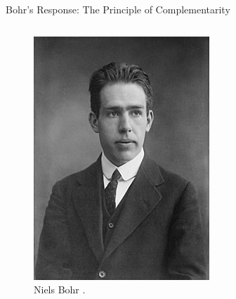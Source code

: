 \begin{frame}{Bohr's Response: The Principle of Complementarity}
\begin{columns}[T]
    \begin{column}{0.45\textwidth}
      \begin{figure}
        \centering
        \includegraphics[width=\linewidth, height=0.7\textheight, keepaspectratio]{images/NielsBohr.jpg}
        \caption{Niels Bohr \cite{bain_news_service_prof_1910}.}
      \end{figure}
    \end{column}
  \end{columns}

\end{frame}

